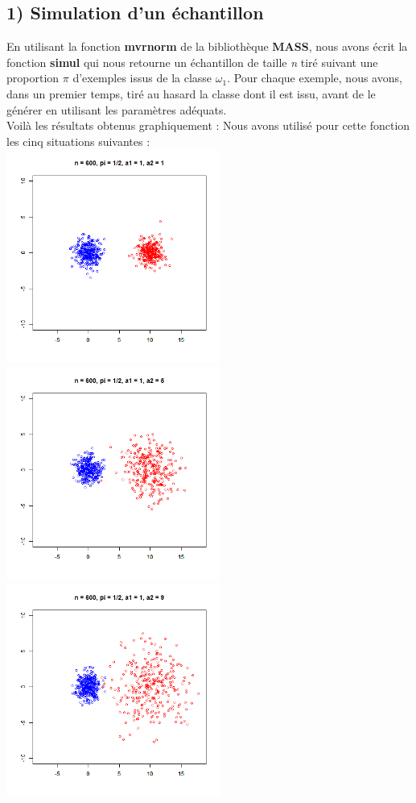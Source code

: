 \documentclass[a4paper, 8pt]{article}
\begin{document}
\subsection*{1) Simulation d'un échantillon}
En utilisant la fonction \textbf{mvrnorm} de la bibliothèque \textbf{MASS}, nous avons écrit la fonction \textbf{simul} qui nous retourne
un échantillon de taille \textit{n} tiré suivant une proportion $\pi$ d'exemples issus de la classe $\omega_{1}$.
Pour chaque exemple, nous avons, dans un premier temps, tiré au hasard la classe dont il est issu,
avant de le générer en utilisant les paramètres adéquats.\\
Voilà les résultats obtenus graphiquement :
Nous avons utilisé pour cette fonction les cinq situations suivantes :\\
\includegraphics[height = 7cm, width = 7cm]{plots/plot_simul_1.png}
\includegraphics[height = 7cm, width = 7cm]{plots/plot_simul_2.png}\\
\includegraphics[height = 7cm, width = 7cm]{plots/plot_simul_3.png}
\end{document}
